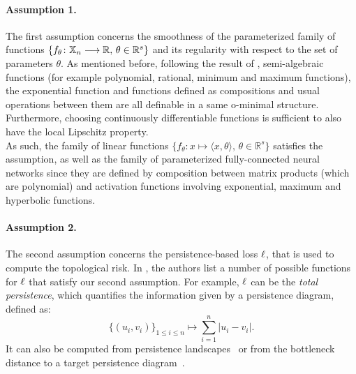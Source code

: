 \paragraph*{Assumption 1.} The first assumption concerns the smoothness of the parameterized family of functions $\{f_\theta\colon\mathbb{X}_n \longrightarrow\mathbb{R},\,\theta\in\mathbb{R}^s\}$ and its regularity with respect to the set of parameters $\theta$. As mentioned before, following the result of \cite{wilkie1996model}, semi-algebraic functions (for example polynomial, rational, minimum and maximum functions), the exponential function and functions defined as compositions and usual operations between them are all definable in a same o-minimal structure. Furthermore, choosing continuously differentiable functions is sufficient to also have the local Lipschitz property.\\
    As such, the family of linear functions $\{f_\theta\colon x\mapsto\langle x,\theta \rangle,\,\theta\in\mathbb{R}^s\}$ satisfies the assumption, as well as the family of parameterized fully-connected neural networks since they are defined by composition between matrix products (which are polynomial) and activation functions involving exponential, maximum and hyperbolic functions.

\paragraph*{Assumption 2.} The second assumption concerns the persistence-based loss $\ell$, that is used to compute the topological risk. In \cite{carriere2021optimizing}, the authors list a number of possible functions for $\ell$ that satisfy our second assumption. For example, $\ell$ can be the \emph{total persistence}, which quantifies the information given by a persistence diagram, defined as:
    $$\{(u_i,v_i)\}_{1\leq i\leq n}\longmapsto \sum_{i=1}^{n}\vert u_i-v_i\vert.$$
    It can also be computed from persistence landscapes~\cite{Bubenik2015} or from the bottleneck distance to a target persistence diagram~\cite{carriere2021optimizing}.

